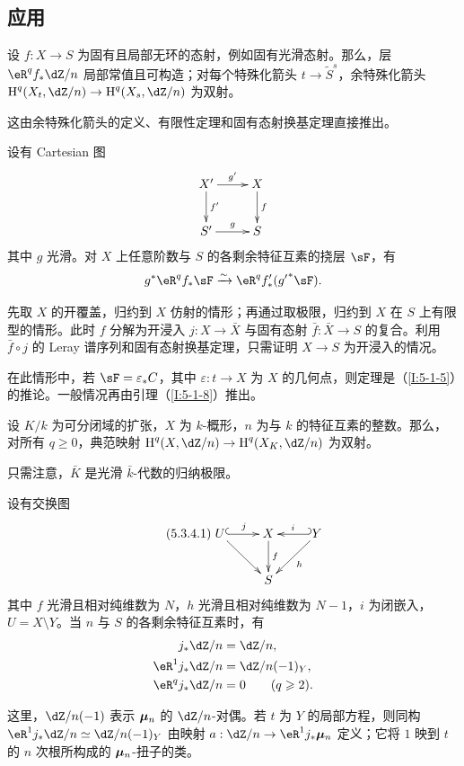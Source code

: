\subsection{应用}\label{I:5-3}
\begin{theorem}[上同调群的特殊化]\label{I:5-3-1}
设 $f:X\to S$ 为固有且局部无环的态射，例如固有光滑态射。那么，层 $\eR^qf_*\dZ/n$ 局部常值且可构造；对每个特殊化箭头 $t\to\widetilde S^s$，余特殊化箭头 $\h^q(X_t,\dZ/n)\to\h^q(X_s,\dZ/n)$ 为双射。
\end{theorem}
这由余特殊化箭头的定义、有限性定理和固有态射换基定理直接推出。
\begin{theorem}[光滑态射换基]\label{I:5-3-2}
设有 Cartesian 图
\[\xymatrix{
X'\ar[r]^-{g'}\ar[d]^-{f'}&X\ar[d]^-f\\
S'\ar[r]^-g&S
}\]
其中 $g$ 光滑。对 $X$ 上任意阶数与 $S$ 的各剩余特征互素的挠层 $\sF$，有
\[
g^*\eR^qf_*\sF\iso\eR^qf'_*({g'}^*\sF).
\]
\end{theorem}
先取 $X$ 的开覆盖，归约到 $X$ 仿射的情形；再通过取极限，归约到 $X$ 在 $S$ 上有限型的情形。此时 $f$ 分解为开浸入 $j:X\to\bar X$ 与固有态射 $\bar f:\bar X\to S$ 的复合。利用 $\bar f\circ j$ 的 Leray 谱序列和固有态射换基定理，只需证明 $X\to S$ 为开浸入的情况。

在此情形中，若 $\sF=\varepsilon_*C$，其中 $\varepsilon:t\to X$ 为 $X$ 的几何点，则定理是（\ref{I:5-1-5}）的推论。一般情况再由引理（\ref{I:5-1-8}）推出。
\begin{corollary}\label{I:5-3-3}
设 $K/k$ 为可分闭域的扩张，$X$ 为 $k$-概形，$n$ 为与 $k$ 的特征互素的整数。那么，对所有 $q\geqslant0$，典范映射 $\h^q(X,\dZ/n)\to\h^q(X_K,\dZ/n)$ 为双射。
\end{corollary}
只需注意，$\bar K$ 是光滑 $\bar k$-代数的归纳极限。
\begin{theorem}[相对纯性]\label{I:5-3-4}
设有交换图
\begin{equation*}\tag{5.3.4.1}\label{I:eq:5-3-4-1}
\xymatrix{
U\ar@{^{(}->}[r]^-j\ar[dr]&X\ar[d]^-f&\ar@{_{(}->}[l]_-iY\ar[dl]^-h\\
&S
}
\end{equation*}
其中 $f$ 光滑且相对纯维数为 $N$，$h$ 光滑且相对纯维数为 $N-1$，$i$ 为闭嵌入，$U=X\setminus Y$。当 $n$ 与 $S$ 的各剩余特征互素时，有
\[
\begin{aligned}
j_*\dZ/n&=\dZ/n,\\
\eR^1j_*\dZ/n&=\dZ/n(-1)_Y,\\
\eR^qj_*\dZ/n&=0\qquad(q\geqslant2).
\end{aligned}
\]
\end{theorem}
这里，$\dZ/n(-1)$ 表示 ${\bm\mu}_n$ 的 $\dZ/n$-对偶。若 $t$ 为 $Y$ 的局部方程，则同构 $\eR^1j_*\dZ/n\simeq\dZ/n(-1)_Y$ 由映射 $a:\dZ/n\to\eR^1j_*\dmu_n$ 定义；它将 $1$ 映到 $t$ 的 $n$ 次根所构成的 ${\bm\mu}_n$-扭子的类。

